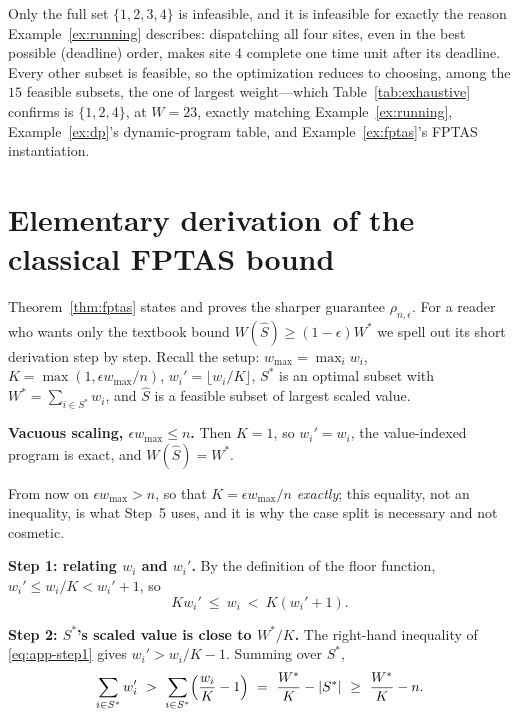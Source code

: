 \documentclass[pdflatex,sn-mathphys-ay]{sn-jnl}
\theoremstyle{thmstyleone}
\theoremstyle{thmstyletwo}
\theoremstyle{thmstylethree}
\begin{document}
\begin{appendices}
Only the full set $\{1,2,3,4\}$ is infeasible, and it is infeasible for
exactly the reason Example~\ref{ex:running} describes: dispatching all
four sites, even in the best possible (deadline) order, makes site $4$
complete one time unit after its deadline. Every other subset is
feasible, so the optimization reduces to choosing, among the $15$
feasible subsets, the one of largest weight---which Table~\ref{tab:exhaustive}
confirms is $\{1,2,4\}$, at $W=23$, exactly matching
Example~\ref{ex:running}, Example~\ref{ex:dp}'s dynamic-program table,
and Example~\ref{ex:fptas}'s FPTAS instantiation.

\section{Elementary derivation of the classical FPTAS bound}\label{app:fptas-detail}

Theorem~\ref{thm:fptas} states and proves the sharper guarantee
$\rho_{n,\epsilon}$. For a reader who wants only the textbook bound
$W(\hat S)\ge(1-\epsilon)W^\ast$ we spell out its short derivation step by
step. Recall the setup: $w_{\max}=\max_iw_i$,
$K=\max(1,\epsilon w_{\max}/n)$, $w_i'=\lfloor w_i/K\rfloor$, $S^\ast$ is
an optimal subset with $W^\ast=\sum_{i\in S^\ast}w_i$, and $\hat S$ is a
feasible subset of largest scaled value.

\textbf{Vacuous scaling, $\epsilon w_{\max}\le n$.} Then $K=1$, so
$w_i'=w_i$, the value-indexed program is exact, and $W(\hat S)=W^\ast$.

From now on $\epsilon w_{\max}>n$, so that $K=\epsilon w_{\max}/n$
\emph{exactly}; this equality, not an inequality, is what Step~5 uses, and
it is why the case split is necessary and not cosmetic.

\textbf{Step 1: relating $w_i$ and $w_i'$.} By the definition of the
floor function, $w_i'\le w_i/K<w_i'+1$, so
\begin{equation}\label{eq:app-step1}
Kw_i'\ \le\ w_i\ <\ K(w_i'+1).
\end{equation}

\textbf{Step 2: $S^\ast$'s scaled value is close to $W^\ast/K$.} The
right-hand inequality of \eqref{eq:app-step1} gives $w_i'>w_i/K-1$.
Summing over $S^\ast$,
\begin{equation}\label{eq:app-step2}
\sum_{i\in S^\ast}w_i'\ >\ \sum_{i\in S^\ast}\Bigl(\frac{w_i}{K}-1\Bigr)
\ =\ \frac{W^\ast}{K}-|S^\ast|\ \ge\ \frac{W^\ast}{K}-n.
\end{equation}


\end{appendices}
\end{document}
